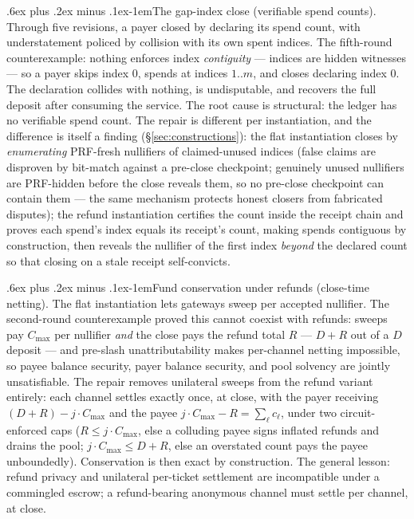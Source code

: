 \documentclass[9pt]{extarticle}
\makeatletter
\renewcommand\paragraph{\@startsection{paragraph}{4}{0pt}%
  {.6ex plus .2ex minus .1ex}{-1em}{\normalfont\normalsize\bfseries}}
\newcommand{\Cmax}{C_{\max}}
\makeatother
\begin{document}
\paragraph{The gap-index close (verifiable spend counts).} Through five
revisions, a payer closed by declaring its spend count, with
understatement policed by collision with its own spent indices. The
fifth-round counterexample: nothing enforces index \emph{contiguity} ---
indices are hidden witnesses --- so a payer skips index 0, spends at
indices $1..m$, and closes declaring index 0. The declaration collides
with nothing, is undisputable, and recovers the full deposit after
consuming the service. The root cause is structural: the ledger has no
verifiable spend count. The repair is different per instantiation, and the
difference is itself a finding (\S\ref{sec:constructions}): the flat
instantiation closes by \emph{enumerating} PRF-fresh nullifiers of
claimed-unused indices (false claims are disproven by bit-match against a
pre-close checkpoint; genuinely unused nullifiers are PRF-hidden before
the close reveals them, so no pre-close checkpoint can contain them ---
the same mechanism protects honest closers from fabricated disputes); the
refund instantiation certifies the count inside the receipt chain and
proves each spend's index equals its receipt's count, making spends
contiguous by construction, then reveals the nullifier of the first index
\emph{beyond} the declared count so that closing on a stale receipt
self-convicts.

\paragraph{Fund conservation under refunds (close-time netting).} The
flat instantiation lets gateways sweep per accepted nullifier. The
second-round counterexample proved this cannot coexist with refunds:
sweeps pay $\Cmax$ per nullifier \emph{and} the close pays the refund
total $R$ --- $D + R$ out of a $D$ deposit --- and pre-slash
unattributability makes per-channel netting impossible, so payee balance
security, payer balance security, and pool solvency are jointly
unsatisfiable. The repair removes unilateral sweeps from the refund
variant entirely: each channel settles exactly once, at close, with the
payer receiving $(D+R) - j \cdot \Cmax$ and the payee
$j \cdot \Cmax - R = \sum_\ell c_\ell$, under two circuit-enforced caps
($R \le j \cdot \Cmax$, else a colluding payee signs inflated refunds and
drains the pool; $j \cdot \Cmax \le D + R$, else an overstated count pays
the payee unboundedly). Conservation is then exact by construction. The
general lesson: refund privacy and unilateral per-ticket settlement are
incompatible under a commingled escrow; a refund-bearing anonymous channel
must settle per channel, at close.
\end{document}
